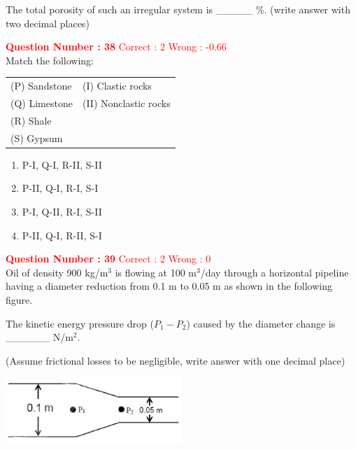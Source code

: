 \documentclass[12pt]{article}
\begin{document}
{The total porosity of such an irregular system is \_\_\_\_\_ \%. (write answer with two decimal places)

\textbf{\textcolor{red}{Question Number : 38}} \hfill \textcolor{red}{Correct : 2  Wrong : -0.66} \\[1ex]
Match the following:

\begin{tabular}{ll}
(P) Sandstone & (I) Clastic rocks \\
(Q) Limestone & (II) Nonclastic rocks \\
(R) Shale & \\
(S) Gypsum & \\
\end{tabular}

\begin{enumerate}[label=(\Alph*)]
    \item P-I, Q-I, R-II, S-II \\
    \item P-II, Q-I, R-I, S-I \\
    \item P-I, Q-II, R-I, S-II \\
    \item P-II, Q-I, R-II, S-I
\end{enumerate}

\vspace{2ex}

\textbf{\textcolor{red}{Question Number : 39}} \hfill \textcolor{red}{Correct : 2  Wrong : 0} \\[1ex]
Oil of density 900 kg/m$^3$ is flowing at 100 m$^3$/day through a horizontal pipeline having a diameter reduction from 0.1 m to 0.05 m as shown in the following figure.

The kinetic energy pressure drop ($P_1 - P_2$) caused by the diameter change is \_\_\_\_\_\_ N/m$^2$.

(Assume frictional losses to be negligible, write answer with one decimal place)

\begin{center}
    \includegraphics[width=0.5\textwidth]{Figs/figQ_39.png}
\end{center}

\vspace{2ex}


}
\end{document}
